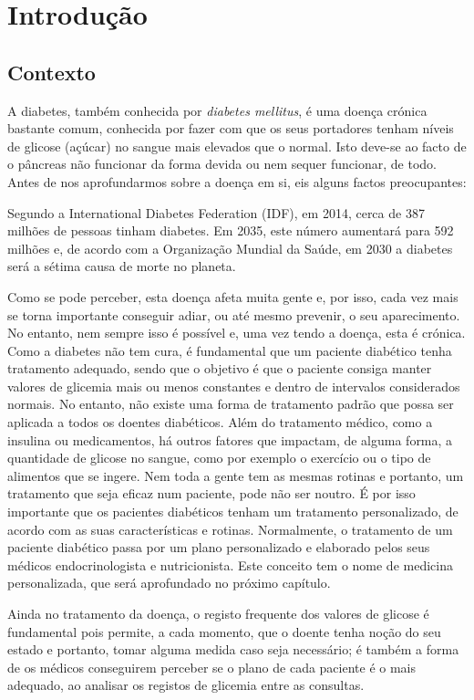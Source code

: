 \chapter{Introdução}\label{chap:intro}

\section{Contexto}

A diabetes, também conhecida por \textit{diabetes mellitus}, é uma doença crónica bastante comum, conhecida por fazer com que os seus portadores tenham níveis de glicose (açúcar) no sangue mais elevados que o normal. Isto deve-se ao facto de o pâncreas não funcionar da forma devida ou nem sequer funcionar, de todo. Antes de nos aprofundarmos sobre a doença em si, eis alguns factos preocupantes:

Segundo a International Diabetes Federation (IDF), em 2014, cerca de 387 milhões de pessoas tinham diabetes. Em 2035, este número aumentará para 592 milhões e, de acordo com a Organização Mundial da Saúde, em 2030 a diabetes será a sétima causa de morte no planeta. 

Como se pode perceber, esta doença afeta muita gente e, por isso, cada vez mais se torna importante conseguir adiar, ou até mesmo prevenir, o seu aparecimento. No entanto, nem sempre isso é possível e, uma vez tendo a doença, esta é crónica. Como a diabetes não tem cura, é fundamental que um paciente diabético tenha tratamento adequado, sendo que o objetivo é que o paciente consiga manter valores de glicemia mais ou menos constantes e dentro de intervalos considerados normais. No entanto, não existe uma forma de tratamento padrão que possa ser aplicada a todos os doentes diabéticos. Além do tratamento médico, como a insulina ou medicamentos, há outros fatores que impactam, de alguma forma, a quantidade de glicose no sangue, como por exemplo o exercício ou o tipo de alimentos que se ingere. Nem toda a gente tem as mesmas rotinas e portanto, um tratamento que seja eficaz num paciente, pode não ser noutro. É por isso importante que os pacientes diabéticos tenham um tratamento personalizado, de acordo com as suas características e rotinas. Normalmente, o tratamento de um paciente diabético passa por um plano personalizado e elaborado pelos seus médicos endocrinologista e nutricionista. Este conceito tem o nome de medicina personalizada, que será aprofundado no próximo capítulo. 

Ainda no tratamento da doença, o registo frequente dos valores de glicose é fundamental pois permite, a cada momento, que o doente tenha noção do seu estado e portanto, tomar alguma medida caso seja necessário; é também a forma de os médicos conseguirem perceber se o plano de cada paciente é o mais adequado, ao analisar os registos de glicemia entre as consultas. 










